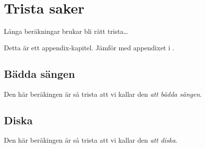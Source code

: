 \chapter{Trista saker}\label{cha:boring}
Långa beräkningar brukar bli rätt trista\dots

Detta är ett appendix-kapitel.  Jämför med appendixet i .

\section{Bädda sängen}

Den här beräkingen är så trista att vi kallar den \emph{att bädda sängen}.

\section{Diska}

Den här beräkingen är så trista att vi kallar den \emph{att diska}.
